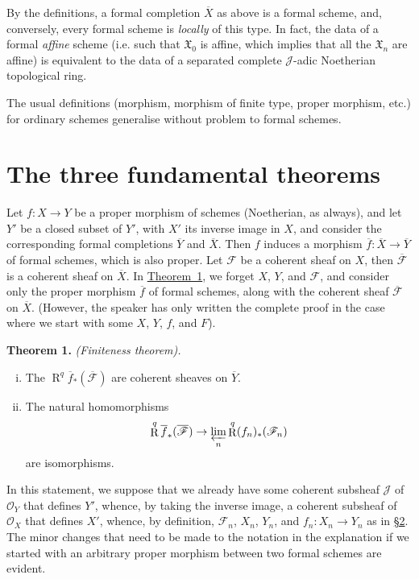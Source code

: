 \documentclass{article}
\newenvironment{itenv}[1]
  {\phantomsection\par\medskip\noindent\textbf{#1.}\itshape}
  {\par\medskip}
\newcommand{\scr}[1]{{\mathscr{#1}}}
\newcommand{\fk}{\mathfrak}
\DeclareMathOperator{\RR}{R}
\begin{document}
By the definitions, a formal completion $\overline{X}$ as above is a formal scheme, and, conversely, every formal scheme is \emph{locally} of this type.
In fact, the data of a formal \emph{affine} scheme (i.e. such that $\fk{X}_0$ is affine, which implies that all the $\fk{X}_n$ are affine) is equivalent to the data of a separated complete $\scr{J}$-adic Noetherian topological ring.

The usual definitions (morphism, morphism of finite type, proper morphism, etc.) for ordinary schemes generalise without problem to formal schemes.


\section{The three fundamental theorems}
\label{section3}

Let $f\colon X\to Y$ be a proper morphism of schemes (Noetherian, as always), and let $Y'$ be a closed subset of $Y'$, with $X'$ its inverse image in $X$, and consider the corresponding formal completions $\overline{Y}$ and $\overline{X}$.
Then $f$ induces a morphism $\overline{f}\colon\overline{X}\to\overline{Y}$ of formal schemes, which is also proper.
Let $\scr{F}$ be a coherent sheaf on $X$, then $\overline{\scr{F}}$ is a coherent sheaf on $\overline{X}$.
In \hyperref[theorem1]{Theorem~1}, we forget $X$, $Y$, and $\scr{F}$, and consider only the proper morphism $\overline{f}$ of formal schemes, along with the coherent sheaf $\overline{\scr{F}}$ on $\overline{X}$.
(However, the speaker has only written the complete proof in the case where we start with some $X$, $Y$, $f$, and $F$).

\begin{itenv}{Theorem 1}
\label{theorem1}
  \emph{(Finiteness theorem).}
  \begin{enumerate}[i.]
    \item The $\RR^q\overline{f}_*(\overline{\scr{F}})$ are coherent sheaves on $\overline{Y}$.
    \item The natural homomorphisms
      \[
        \RR^q\overline{f}_*(\overline{\scr{F}}) \to \varprojlim_n\RR^q (f_n)_*(\scr{F}_n)
      \]
      are isomorphisms.
  \end{enumerate}
\end{itenv}

In this statement, we suppose that we already have some coherent subsheaf $\scr{J}$ of $\scr{O}_Y$ that defines $Y'$, whence, by taking the inverse image, a coherent subsheaf of $\scr{O}_X$ that defines $X'$, whence, by definition, $\scr{F}_n$, $X_n$, $Y_n$, and $f_n\colon X_n\to Y_n$ as in \hyperref[section2]{\S2}.
The minor changes that need to be made to the notation in the explanation if we started with an arbitrary proper morphism between two formal schemes are evident.
\end{document}

